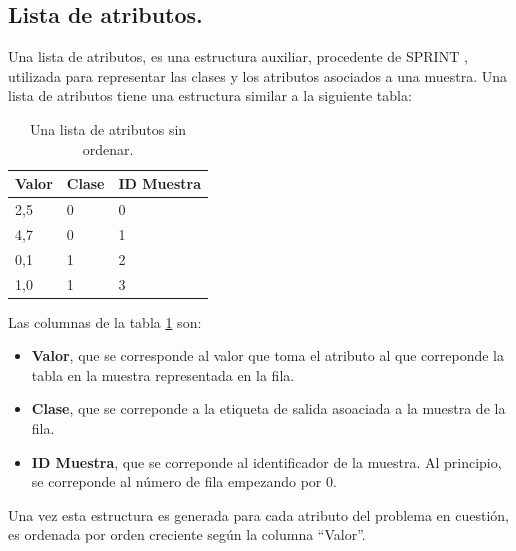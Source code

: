 \subsection{Lista de atributos.}
Una lista de atributos, es una estructura auxiliar, procedente de SPRINT \cite{sprint}, utilizada para representar las clases y los atributos asociados a una muestra. Una lista de atributos tiene una estructura similar a la siguiente tabla:

\begin{table}[ht]
\centering
\begin{tabular}{@{}lll@{}}
\toprule
Valor & Clase & ID Muestra \\ \midrule
2,5   & 0     & 0          \\
4,7   & 0     & 1          \\
0,1   & 1     & 2          \\
1,0   & 1     & 3          \\ \bottomrule
\end{tabular}
\caption{Una lista de atributos sin ordenar.}
\label{tab:ejlistaatributos}
\end{table}

Las columnas de la tabla \ref{tab:ejlistaatributos} son:
\begin{itemize}
    \item \textbf{Valor}, que se corresponde al valor que toma el atributo al que correponde la tabla en la muestra representada en la fila.
    \item \textbf{Clase}, que se correponde a la etiqueta de salida asoaciada a la muestra de la fila.
    \item \textbf{ID Muestra}, que se correponde al identificador de la muestra. Al principio, se correponde al número de fila empezando por 0.
\end{itemize}

Una vez esta estructura es generada para cada atributo del problema en cuestión, es ordenada por orden creciente según la columna ``Valor''.

